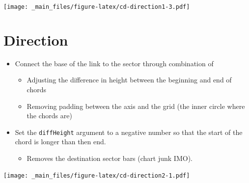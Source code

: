 \documentclass[
]{book}
\newenvironment{Shaded}{\begin{snugshade}}{\end{snugshade}}
\newcommand{\AttributeTok}[1]{\textcolor[rgb]{0.77,0.63,0.00}{#1}}
\newcommand{\CommentTok}[1]{\textcolor[rgb]{0.56,0.35,0.01}{\textit{#1}}}
\newcommand{\DecValTok}[1]{\textcolor[rgb]{0.00,0.00,0.81}{#1}}
\newcommand{\FloatTok}[1]{\textcolor[rgb]{0.00,0.00,0.81}{#1}}
\newcommand{\FunctionTok}[1]{\textcolor[rgb]{0.00,0.00,0.00}{#1}}
\newcommand{\NormalTok}[1]{#1}
\newcommand{\SpecialCharTok}[1]{\textcolor[rgb]{0.00,0.00,0.00}{#1}}
\newcommand{\StringTok}[1]{\textcolor[rgb]{0.31,0.60,0.02}{#1}}
\providecommand{\tightlist}{%
  \setlength{\itemsep}{0pt}\setlength{\parskip}{0pt}}
\begin{document}
\texttt{[image: \_main\_files/figure-latex/cd-direction1-3.pdf]}

\hypertarget{direction-1}{%
\section{Direction}\label{direction-1}}

\begin{itemize}
\tightlist
\item
  Connect the base of the link to the sector through combination of

  \begin{itemize}
  \tightlist
  \item
    Adjusting the difference in height between the beginning and end of chords
  \item
    Removing padding between the axis and the grid (the inner circle where the chords are)
  \end{itemize}
\item
  Set the \texttt{diffHeight} argument to a negative number so that the start of the chord is longer than then end.

  \begin{itemize}
  \tightlist
  \item
    Removes the destination sector bars (chart junk IMO).
  \end{itemize}
\end{itemize}

\begin{Shaded}
\end{Shaded}

\texttt{[image: \_main\_files/figure-latex/cd-direction2-1.pdf]}
\end{document}
